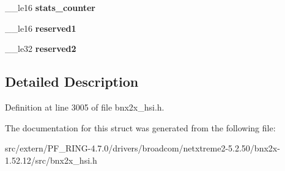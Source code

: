 \begin{DoxyCompactItemize}
\item 
\hypertarget{structxstorm__per__client__stats_a7f630efadd07500ede780ede801cf821}{
\_\-\_\-le16 {\bfseries stats\_\-counter}}
\label{structxstorm__per__client__stats_a7f630efadd07500ede780ede801cf821}

\item 
\hypertarget{structxstorm__per__client__stats_ac5cb02a28b29109adc31b26337b70a4b}{
\_\-\_\-le16 {\bfseries reserved1}}
\label{structxstorm__per__client__stats_ac5cb02a28b29109adc31b26337b70a4b}

\item 
\hypertarget{structxstorm__per__client__stats_a1862b8388abe4e5d664784e8f2b16efb}{
\_\-\_\-le32 {\bfseries reserved2}}
\label{structxstorm__per__client__stats_a1862b8388abe4e5d664784e8f2b16efb}

\end{DoxyCompactItemize}


\subsection{Detailed Description}


Definition at line 3005 of file bnx2x\_\-hsi.h.



The documentation for this struct was generated from the following file:\begin{DoxyCompactItemize}
\item 
src/extern/PF\_\-RING-\/4.7.0/drivers/broadcom/netxtreme2-\/5.2.50/bnx2x-\/1.52.12/src/bnx2x\_\-hsi.h\end{DoxyCompactItemize}

